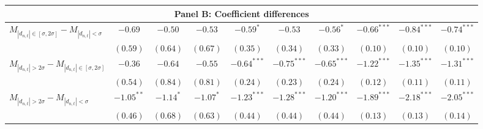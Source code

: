 \begin{tabular}{lccccccccc}
   \hline \multicolumn{10}{c}{Panel B: Coefficient differences} \\
 \hline$M_{|d_{n,t}| \in [\sigma, 2\sigma]} - M_{|d_{n,t}| < \sigma}$ & $-0.69$ & $-0.50$ & $-0.53$ & $-0.59^{*}$ & $-0.53$ & $-0.56^{*}$ & $-0.66^{***}$ & $-0.84^{***}$ & $-0.74^{***}$ \\ 
   & $(0.59)$ & $(0.64)$ & $(0.67)$ & $(0.35)$ & $(0.34)$ & $(0.33)$ & $(0.10)$ & $(0.10)$ & $(0.10)$ \\ 
  $M_{|d_{n,t}| > 2 \sigma} - M_{|d_{n,t}| \in [\sigma, 2\sigma]}$ & $-0.36$ & $-0.64$ & $-0.55$ & $-0.64^{***}$ & $-0.75^{***}$ & $-0.65^{***}$ & $-1.22^{***}$ & $-1.35^{***}$ & $-1.31^{***}$ \\ 
   & $(0.54)$ & $(0.84)$ & $(0.81)$ & $(0.24)$ & $(0.23)$ & $(0.24)$ & $(0.12)$ & $(0.11)$ & $(0.11)$ \\ 
  $M_{|d_{n,t}| > 2 \sigma} - M_{|d_{n,t}| < \sigma}$ & $-1.05^{**}$ & $-1.14^{*}$ & $-1.07^{*}$ & $-1.23^{***}$ & $-1.28^{***}$ & $-1.20^{***}$ & $-1.89^{***}$ & $-2.18^{***}$ & $-2.05^{***}$ \\ 
   & $(0.46)$ & $(0.68)$ & $(0.63)$ & $(0.44)$ & $(0.44)$ & $(0.44)$ & $(0.13)$ & $(0.13)$ & $(0.14)$ \\ 
   \hline 
\end{tabular}
